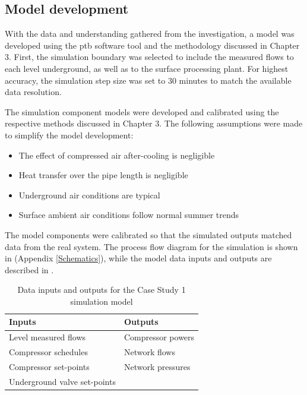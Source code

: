 \subsection{Model development}
With the data and understanding gathered from the investigation, a model was developed using the \gls{ptb} software tool and the methodology discussed in Chapter 3. First, the simulation boundary was selected to include the measured flows to each level underground, as well as to the surface processing plant. For highest accuracy, the simulation step size was set to 30 minutes to match the available data resolution.
\par
The simulation component models were developed and calibrated using the respective methods discussed in Chapter 3. The following assumptions were made to simplify the model development:
\begin{itemize}
	\item The effect of compressed air after-cooling is negligible
	\item Heat transfer over the pipe length is negligible
	\item Underground air conditions are typical
	\item Surface ambient air conditions follow normal summer trends
\end{itemize} 
The model components were calibrated so that the simulated outputs matched data from the real system. The process flow diagram for the simulation is shown in  (Appendix \ref{Schematics}), while the model data inputs and outputs are described in .\\

\begin{table}[h!]
	\caption{Data inputs and outputs for the Case Study 1 simulation model }
	\centering
	\begin{tabular}{ll}
		\hline
		Inputs \hspace*{4cm} &Outputs \hspace*{4cm} \\ \hline
		Level measured flows&Compressor powers \\
		Compressor schedules& Network flows \\
		Compressor  set-points& Network pressures \\
		Underground valve  set-points& \\
		\hline
	\end{tabular}
	\label{table: Mine A inputs/outputs}
\end{table}

